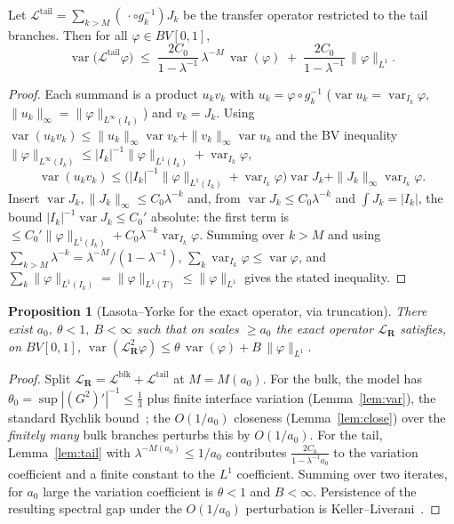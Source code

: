 \documentclass[11pt]{article}
\newtheorem{proposition}{Proposition}\newtheorem{corollary}{Corollary}
\theoremstyle{definition}\newtheorem{definition}{Definition}
\theoremstyle{remark}\newtheorem{remark}{Remark}
\newcommand{\R}{\mathbf{R}}\newcommand{\Z}{\mathbb{Z}}\newcommand{\N}{\mathbb{N}}
\DeclareMathOperator{\var}{var}
\begin{document}
\begin{lemma}\label{lem:tail}
Let $\mathcal L^{\mathrm{tail}}=\sum_{k>M}(\,\cdot\circ g_k^{-1})J_k$ be the
transfer operator restricted to the tail branches. Then for all
$\varphi\in BV[0,1]$,
\[
\var\bigl(\mathcal L^{\mathrm{tail}}\varphi\bigr)\;\le\;
\frac{2C_0}{1-\lambda^{-1}}\,\lambda^{-M}\,\var(\varphi)\;+\;
\frac{2C_0}{1-\lambda^{-1}}\,\|\varphi\|_{L^1}.
\]
\end{lemma}
\begin{proof}
Each summand is a product $u_kv_k$ with $u_k=\varphi\circ g_k^{-1}$
($\var u_k=\var_{I_k}\varphi$, $\|u_k\|_\infty=\|\varphi\|_{L^\infty(I_k)}$)
and $v_k=J_k$. Using $\var(u_kv_k)\le\|u_k\|_\infty\var v_k+\|v_k\|_\infty\var u_k$
and the BV inequality $\|\varphi\|_{L^\infty(I_k)}\le
|I_k|^{-1}\|\varphi\|_{L^1(I_k)}+\var_{I_k}\varphi$,
\[
\var(u_kv_k)\le\bigl(|I_k|^{-1}\|\varphi\|_{L^1(I_k)}+\var_{I_k}\varphi\bigr)\var J_k
+\|J_k\|_\infty\var_{I_k}\varphi .
\]
Insert $\var J_k,\|J_k\|_\infty\le C_0\lambda^{-k}$ and, from
$\var J_k\le C_0\lambda^{-k}$ and $\int J_k=|I_k|$, the bound
$|I_k|^{-1}\var J_k\le C_0'$ absolute: the first term is
$\le C_0'\|\varphi\|_{L^1(I_k)}+C_0\lambda^{-k}\var_{I_k}\varphi$. Summing
over $k>M$ and using $\sum_{k>M}\lambda^{-k}=\lambda^{-M}/(1-\lambda^{-1})$,
$\sum_k\var_{I_k}\varphi\le\var\varphi$, and $\sum_k\|\varphi\|_{L^1(I_k)}=
\|\varphi\|_{L^1(T)}\le\|\varphi\|_{L^1}$ gives the stated inequality.
\end{proof}

\begin{proposition}[Lasota--Yorke for the exact operator, via truncation]\label{prop:LY}
There exist $a_0,\ \theta<1,\ B<\infty$ such that on scales $\ge a_0$ the
exact operator $\mathcal L_{\R}$ satisfies, on $BV[0,1]$,
$\var(\mathcal L_{\R}^{2}\varphi)\le \theta\,\var(\varphi)+B\,\|\varphi\|_{L^1}.$
\end{proposition}
\begin{proof}
Split $\mathcal L_\R=\mathcal L^{\mathrm{blk}}+\mathcal L^{\mathrm{tail}}$ at
$M=M(a_0)$. For the bulk, the model has
$\theta_0=\sup|(G^2)'|^{-1}\le\tfrac13$ plus finite interface variation
(Lemma~\ref{lem:var}), the standard Rychlik bound~\cite{Rychlik}; the
$O(1/a_0)$ closeness (Lemma~\ref{lem:close}) over the \emph{finitely many}
bulk branches perturbs this by $O(1/a_0)$. For the tail,
Lemma~\ref{lem:tail} with $\lambda^{-M(a_0)}\le1/a_0$ contributes
$\tfrac{2C_0}{1-\lambda^{-1}a_0}$ to the variation coefficient and a finite
constant to the $L^1$ coefficient. Summing over two iterates, for $a_0$
large the variation coefficient is $\theta<1$ and $B<\infty$. Persistence of
the resulting spectral gap under the $O(1/a_0)$ perturbation is
Keller--Liverani~\cite{KL}.
\end{proof}
\end{document}
